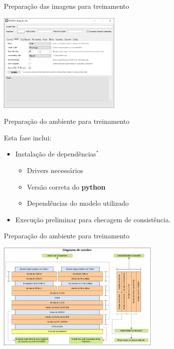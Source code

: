 \documentclass{beamer}
\begin{document}
    \begin{frame}{Preparação das imagens para treinamento}{\thesection \, \secname}

        \centering
        \includegraphics[width=06cm]{img/magick-utils.png} \\

    \end{frame}

    
    
    \begin{frame}{Preparação do ambiente para treinamento}{\thesection \, \secname}

        Esta fase inclui:

        \begin{itemize}
            \item Instalação de dependências$^\ast$
            \begin{itemize}
                \item Drivers necessários
                \item Versão correta do \textbf{python}
                \item Dependências do modelo utilizado
            \end{itemize}
            \item Execução preliminar para checagem de consistência.
        \end{itemize}

    \end{frame}

    \begin{frame}{Preparação do ambiente para treinamento}{\thesection \, \secname}

        \centering
        \includegraphics[width=8cm]{img/version_diagram.png} \\

    \end{frame}
\end{document}
